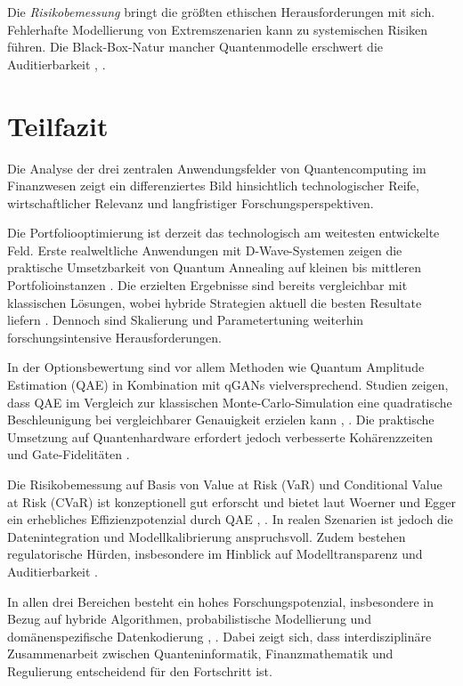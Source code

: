 Die \textit{Risikobemessung} bringt die größten ethischen Herausforderungen mit sich. Fehlerhafte Modellierung von Extremszenarien kann zu systemischen Risiken führen. Die Black-Box-Natur mancher Quantenmodelle erschwert die Auditierbarkeit \cite[S.~6]{orus_quantum_2019}, \cite[S.~4]{zoufal_quantum_2019}.

\section{Teilfazit}

Die Analyse der drei zentralen Anwendungsfelder von Quantencomputing im Finanzwesen zeigt ein differenziertes Bild hinsichtlich technologischer Reife, wirtschaftlicher Relevanz und langfristiger Forschungsperspektiven.

Die Portfoliooptimierung ist derzeit das technologisch am weitesten entwickelte Feld. Erste realweltliche Anwendungen mit D-Wave-Systemen zeigen die praktische Umsetzbarkeit von Quantum Annealing auf kleinen bis mittleren Portfolioinstanzen \cite[S.~1–2]{sakuler_real-world_2025}. Die erzielten Ergebnisse sind bereits vergleichbar mit klassischen Lösungen, wobei hybride Strategien aktuell die besten Resultate liefern \cite[S.~5]{sakuler_real-world_2025}. Dennoch sind Skalierung und Parametertuning weiterhin forschungsintensive Herausforderungen.

In der Optionsbewertung sind vor allem Methoden wie Quantum Amplitude Estimation (QAE) in Kombination mit qGANs vielversprechend. Studien zeigen, dass QAE im Vergleich zur klassischen Monte-Carlo-Simulation eine quadratische Beschleunigung bei vergleichbarer Genauigkeit erzielen kann \cite[S.~6]{zoufal_quantum_2019}, \cite[S.~4]{stamatopoulos_option_2020}. Die praktische Umsetzung auf Quantenhardware erfordert jedoch verbesserte Kohärenzzeiten und Gate-Fidelitäten \cite[S.~7]{zoufal_quantum_2019}.

Die Risikobemessung auf Basis von Value at Risk (VaR) und Conditional Value at Risk (CVaR) ist konzeptionell gut erforscht und bietet laut Woerner und Egger ein erhebliches Effizienzpotenzial durch QAE \cite[S.~5]{orus_quantum_2019}, \cite[S.~6]{zhou_quantum_2025}. In realen Szenarien ist jedoch die Datenintegration und Modellkalibrierung anspruchsvoll. Zudem bestehen regulatorische Hürden, insbesondere im Hinblick auf Modelltransparenz und Auditierbarkeit \cite[S.~5]{egger2020}.

In allen drei Bereichen besteht ein hohes Forschungspotenzial, insbesondere in Bezug auf hybride Algorithmen, probabilistische Modellierung und domänenspezifische Datenkodierung \cite[S.~6]{zoufal_quantum_2019}, \cite[S.~3]{zhou_quantum_2025}. Dabei zeigt sich, dass interdisziplinäre Zusammenarbeit zwischen Quanteninformatik, Finanzmathematik und Regulierung entscheidend für den Fortschritt ist.

